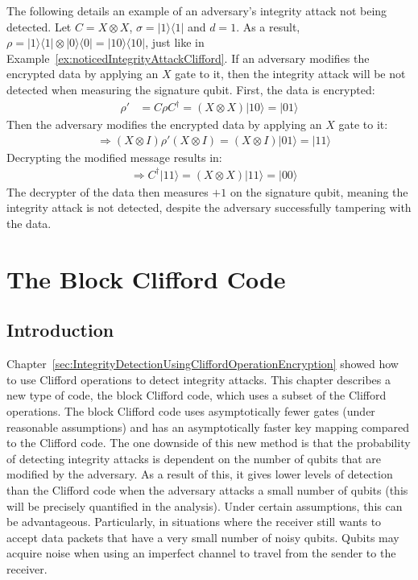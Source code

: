 \begin{example}
\label{ex:unnoticedIntegrityAttackClifford}
		The following details an example of an adversary's integrity attack not being detected. Let $C = X \otimes X$, $\sigma = |1\rangle\langle1|$ and $d = 1$. As a result, $\rho = |1\rangle\langle1| \otimes |0\rangle\langle0| = |10\rangle\langle10|$, just like in Example~\ref{ex:noticedIntegrityAttackClifford}. If an adversary modifies the encrypted data by applying an $X$ gate to it, then the integrity attack will be not detected when measuring the signature qubit. First, the data is encrypted:
	\begin{align}
	\rho' &= C\rho C^{\dagger} = (X \otimes X)|10\rangle = |01\rangle
	\end{align}
    Then the adversary modifies the encrypted data by applying an $X$ gate to it:
	\begin{align}
	& \Rightarrow (X \otimes I) \rho' (X \otimes I) = (X \otimes I) |01\rangle = |11\rangle
	\end{align}
	Decrypting the modified message results in:
	\begin{align}
	& \Rightarrow C^{\dagger}|11\rangle = (X \otimes X)|11\rangle = |00\rangle
	\end{align}
	The decrypter of the data then measures $+1$ on the signature qubit, meaning the integrity attack is not detected, despite the adversary successfully tampering with the data. 
\end{example}

\pagebreak
\chapter{The Block Clifford Code}
\label{sec:PerezCode}
\section{Introduction}
Chapter~\ref{sec:IntegrityDetectionUsingCliffordOperationEncryption} showed how to use Clifford operations to detect integrity attacks. This chapter describes a new type of code, the block Clifford code, which uses a subset of the Clifford operations. The block Clifford code uses asymptotically fewer gates (under reasonable assumptions) and has an asymptotically faster key mapping compared to the Clifford code. The one downside of this new method is that the probability of detecting integrity attacks is dependent on the number of qubits that are modified by the adversary. As a result of this, it gives lower levels of detection than the Clifford code when the adversary attacks a small number of qubits (this will be precisely quantified in the analysis). Under certain assumptions, this can be advantageous. Particularly, in situations where the receiver still wants to accept data packets that have a very small number of noisy qubits. Qubits may acquire noise when using an imperfect channel to travel from the sender to the receiver.

